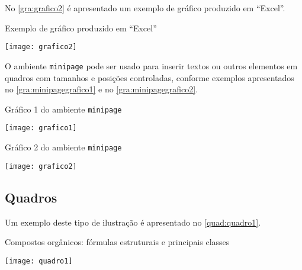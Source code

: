 No \autoref{gra:grafico2} é apresentado um exemplo de gráfico produzido em ``Excel''.

\begin{graph}[htb]%
    \caption{Exemplo de gráfico produzido em ``Excel''}%
    \label{gra:grafico2}%
    \texttt{[image: grafico2]}%
\end{graph}

O ambiente \texttt{minipage} pode ser usado para inserir textos ou outros elementos em quadros com tamanhos e posições controladas, conforme exemplos apresentados no \autoref{gra:minipagegrafico1} e no \autoref{gra:minipagegrafico2}.

\begin{graph}[htb]%
    \begin{minipage}[t]{0.395\textwidth}%
        \centering%
        \caption{Gráfico 1 do ambiente \texttt{minipage}}%
        \label{gra:minipagegrafico1}%
        \texttt{[image: grafico1]}%
    \end{minipage}
    \hfill
    \begin{minipage}[t]{0.595\textwidth}%
        \centering%
        \captionsetup{width=0.95\textwidth}%
        \caption{Gráfico 2 do ambiente \texttt{minipage}}%
        \label{gra:minipagegrafico2}%
        \texttt{[image: grafico2]}%
    \end{minipage}
    \label{gra:minipagegraficos}
\end{graph}

\subsection{Quadros}\label{sec:quadros}

Um exemplo deste tipo de ilustração é apresentado no \autoref{quad:quadro1}.

\begin{tabframed}[htb]%
    \caption{Compostos orgânicos: fórmulas estruturais e principais classes}%
    \label{quad:quadro1}%
    \texttt{[image: quadro1]}%
\end{tabframed}

